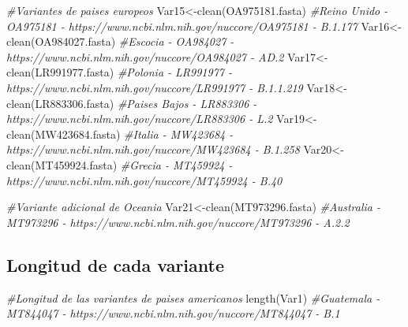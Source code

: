 \documentclass[
]{article}
\newenvironment{Shaded}{\begin{snugshade}}{\end{snugshade}}
\newcommand{\CommentTok}[1]{\textcolor[rgb]{0.56,0.35,0.01}{\textit{#1}}}
\newcommand{\FunctionTok}[1]{\textcolor[rgb]{0.00,0.00,0.00}{#1}}
\newcommand{\NormalTok}[1]{#1}
\newcommand{\OtherTok}[1]{\textcolor[rgb]{0.56,0.35,0.01}{#1}}
\newcommand{\StringTok}[1]{\textcolor[rgb]{0.31,0.60,0.02}{#1}}
\begin{document}
\begin{Shaded}
\begin{Highlighting}[]
\CommentTok{\#Variantes de paises europeos}
\NormalTok{Var15}\OtherTok{\textless{}{-}}\FunctionTok{clean}\NormalTok{(}\StringTok{\textquotesingle{}OA975181.fasta\textquotesingle{}}\NormalTok{) }\CommentTok{\#Reino Unido {-} OA975181  {-} https://www.ncbi.nlm.nih.gov/nuccore/OA975181 {-} B.1.177}
\NormalTok{Var16}\OtherTok{\textless{}{-}}\FunctionTok{clean}\NormalTok{(}\StringTok{\textquotesingle{}OA984027.fasta\textquotesingle{}}\NormalTok{) }\CommentTok{\#Escocia {-} OA984027 {-} https://www.ncbi.nlm.nih.gov/nuccore/OA984027 {-} AD.2}
\NormalTok{Var17}\OtherTok{\textless{}{-}}\FunctionTok{clean}\NormalTok{(}\StringTok{\textquotesingle{}LR991977.fasta\textquotesingle{}}\NormalTok{) }\CommentTok{\#Polonia {-} LR991977 {-} https://www.ncbi.nlm.nih.gov/nuccore/LR991977 {-} B.1.1.219}
\NormalTok{Var18}\OtherTok{\textless{}{-}}\FunctionTok{clean}\NormalTok{(}\StringTok{\textquotesingle{}LR883306.fasta\textquotesingle{}}\NormalTok{) }\CommentTok{\#Paises Bajos {-} LR883306 {-} https://www.ncbi.nlm.nih.gov/nuccore/LR883306 {-} L.2}
\NormalTok{Var19}\OtherTok{\textless{}{-}}\FunctionTok{clean}\NormalTok{(}\StringTok{\textquotesingle{}MW423684.fasta\textquotesingle{}}\NormalTok{) }\CommentTok{\#Italia {-} MW423684 {-} https://www.ncbi.nlm.nih.gov/nuccore/MW423684 {-} B.1.258}
\NormalTok{Var20}\OtherTok{\textless{}{-}}\FunctionTok{clean}\NormalTok{(}\StringTok{\textquotesingle{}MT459924.fasta\textquotesingle{}}\NormalTok{) }\CommentTok{\#Grecia {-} MT459924 {-} https://www.ncbi.nlm.nih.gov/nuccore/MT459924 {-} B.40}

\CommentTok{\#Variante adicional de Oceania}
\NormalTok{Var21}\OtherTok{\textless{}{-}}\FunctionTok{clean}\NormalTok{(}\StringTok{\textquotesingle{}MT973296.fasta\textquotesingle{}}\NormalTok{) }\CommentTok{\#Australia {-} MT973296 {-} https://www.ncbi.nlm.nih.gov/nuccore/MT973296 {-} A.2.2}
\end{Highlighting}
\end{Shaded}

\hypertarget{longitud-de-cada-variante}{%
\subsection{Longitud de cada variante}\label{longitud-de-cada-variante}}

\begin{Shaded}
\begin{Highlighting}[]
\CommentTok{\#Longitud de las variantes de paises americanos}
\FunctionTok{length}\NormalTok{(Var1) }\CommentTok{\#Guatemala {-} MT844047 {-} https://www.ncbi.nlm.nih.gov/nuccore/MT844047 {-} B.1}
\end{Highlighting}
\end{Shaded}
\end{document}
